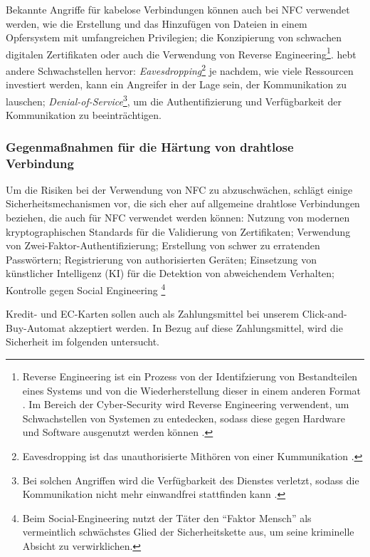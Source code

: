 Bekannte Angriffe für kabelose Verbindungen können auch bei NFC verwendet werden\cite{refip:NYRS}, wie die
Erstellung und das Hinzufügen von Dateien in einem Opfersystem mit umfangreichen Privilegien; die Konzipierung
von schwachen digitalen Zertifikaten oder auch die Verwendung von Reverse Engineering\footnote{Reverse
Engineering ist ein Prozess von der Identifzierung von Bestandteilen eines Systems und von die Wiederherstellung 
dieser in einem anderen Format \cite{refart:CHRE}. Im Bereich der Cyber-Security wird Reverse Engineering 
verwendent, um Schwachstellen von Systemen zu entedecken, sodass diese gegen Hardware und Software ausgenutzt werden können \cite{refip:CMBM}.}.
\cite{refart:ALSI} hebt andere Schwachstellen hervor: 
\textit{Eavesdropping}\footnote{Eavesdropping ist das unauthorisierte Mithören von einer Kummunikation \cite{refbook:SWIS}.}
je nachdem, wie viele Ressourcen investiert werden, kann ein Angreifer in der Lage sein, der Kommunikation
zu lauschen; \textit{Denial-of-Service}\footnote{Bei solchen Angriffen wird die Verfügbarkeit des Dienstes verletzt, 
sodass die Kommunikation nicht mehr einwandfrei stattfinden kann \cite{refbook:SWIS}.}, um die Authentifizierung
und Verfügbarkeit der Kommunikation zu beeinträchtigen.


\subsubsection{Gegenmaßnahmen für die Härtung von drahtlose Verbindung}

Um die Risiken bei der Verwendung von NFC zu abzuschwächen, schlägt \cite{refip:NYRS} einige Sicherheitsmechanismen vor, 
die sich eher auf allgemeine drahtlose Verbindungen beziehen, die auch für NFC verwendet werden können: Nutzung von modernen 
kryptographischen Standards für die Validierung von Zertifikaten; Verwendung von Zwei-Faktor-Authentifizierung; Erstellung
von schwer zu erratenden Passwörtern; Registrierung von authorisierten Geräten; Einsetzung von künstlicher Intelligenz 
(KI) für die Detektion von abweichendem Verhalten; Kontrolle gegen Social Engineering \footnote{Beim Social-Engineering
nutzt der Täter den ``Faktor Mensch'' als vermeintlich schwächstes Glied der Sicherheitskette aus, um seine kriminelle
 Absicht zu verwirklichen.\cite{booklet:BSSE}}


 Kredit- und EC-Karten sollen auch als Zahlungsmittel bei unserem Click-and-Buy-Automat akzeptiert werden. 
In Bezug auf diese Zahlungsmittel, wird die Sicherheit im folgenden untersucht.

